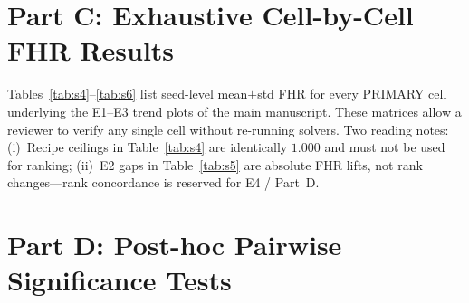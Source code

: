 \documentclass[lettersize,journal,onecolumn]{IEEEtran}
\begin{document}
\clearpage
\section{Part C: Exhaustive Cell-by-Cell FHR Results}
\label{sec:sc}

Tables~\ref{tab:s4}--\ref{tab:s6} list seed-level mean$\pm$std FHR for every PRIMARY cell underlying
the E1--E3 trend plots of the main manuscript.
These matrices allow a reviewer to verify any single cell without re-running solvers.
Two reading notes:
(i)~Recipe ceilings in Table~\ref{tab:s4} are identically $1.000$ and must not be used for ranking;
(ii)~E2 gaps in Table~\ref{tab:s5} are absolute FHR lifts, not rank changes---rank concordance is reserved for E4 / Part~D.

\begin{table}[!t]
\centering
\caption{E1 full scale sweep (seed-level mean$\pm$std FHR).
Recipe rows are a perfect ceiling ($\mathrm{FHR}=1.000$ for every solver) and are excluded from ranking aggregates
in the main manuscript. NHANES scales use the matched interval construction.}
\label{tab:s4}
\scriptsize
\setlength{\tabcolsep}{2.2pt}
\resizebox{\textwidth}{!}{}
\end{table}

\begin{table}[!t]
\centering
\caption{E2 full sparsity sweep (seed-level mean$\pm$std FHR) on NHANES-10K.
The final row reports the absolute FHR lift from $f=0.5$ to $f=1.5$ for each solver,
quantifying the ``nearly an order of magnitude'' difficulty shift emphasized in the main manuscript.}
\label{tab:s5}
\scriptsize
\setlength{\tabcolsep}{2.2pt}
\resizebox{\textwidth}{!}{}
\end{table}

\begin{table}[!t]
\centering
\caption{E3 full dimension sweep (seed-level mean$\pm$std FHR) on NHANES-10K.
Boldface marks the best mean in each row.
Low dimensions sit near ceiling; dimension~$16$ exposes selective degradation of weaker solvers.}
\label{tab:s6}
\scriptsize
\setlength{\tabcolsep}{2.5pt}
\resizebox{\textwidth}{!}{}
\end{table}

\clearpage
\section{Part D: Post-hoc Pairwise Significance Tests}
\label{sec:sd}
\end{document}

